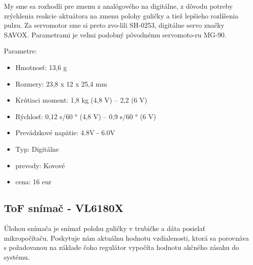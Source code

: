 My sme sa rozhodli pre zmenu z analógového na digitálne, z dôvodu potreby zrýchlenia reakcie aktuátora na zmenu polohy guličky a tiež lepšieho rozlíšenia pulzu. Za servomotor sme si preto zvo-lili SH-0253, digitálne servo značky SAVOX. Parametrami je veľmi podobný pôvodnému servomoto-ru MG-90. 

Parametre:
\begin{itemize}
	\item Hmotnosť: 13,6 g
	\item 	Rozmery: 23,8 x 12 x 25,4 mm 
	\item 	Krútiaci moment: 1,8 kg (4,8 V) – 2,2 (6 V)
	\item   Rýchlosť: 0,12 s/60 ° (4,8 V) – 0,9 s/60 ° (6 V)
	\item	Prevádzkové napätie: 4.8V - 6.0V 
	\item 	Typ: Digitálne
	\item	prevody: Kovové
	\item 	cena: 16 eur
\end{itemize}


\subsection{ToF snímač - VL6180X}
\label{kap:2.2.2}

Úlohou snímača je snímať polohu guličky v trubičke a dáta posielať mikropočítaču. Poskytuje nám aktuálnu hodnotu vzdialenosti, ktorá sa porovnáva s požadovanou na základe čoho regulátor vypočíta hodnotu akčného zásahu do systému.

